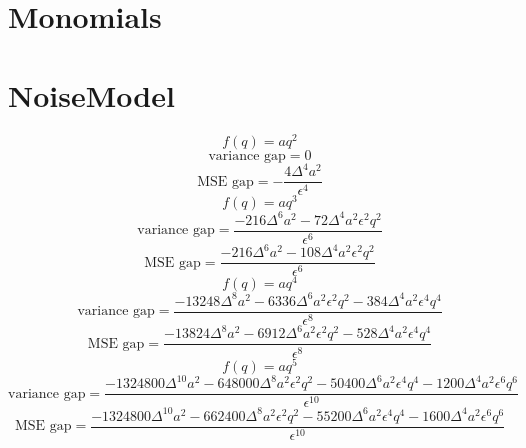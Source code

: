 \documentclass{article}
\begin{document}
\section*{Monomials}
\section*{NoiseModel}
\begin{dmath*}
f(q) = a q^{2}
\end{dmath*}
\begin{dmath*}
\text{variance gap} = 0
\end{dmath*}
\begin{dmath*}
\text{MSE gap} = - \frac{4 \Delta^{4} a^{2}}{\epsilon^{4}}
\end{dmath*}
\begin{dmath*}
f(q) = a q^{3}
\end{dmath*}
\begin{dmath*}
\text{variance gap} = \frac{- 216 \Delta^{6} a^{2} - 72 \Delta^{4} a^{2} \epsilon^{2} q^{2}}{\epsilon^{6}}
\end{dmath*}
\begin{dmath*}
\text{MSE gap} = \frac{- 216 \Delta^{6} a^{2} - 108 \Delta^{4} a^{2} \epsilon^{2} q^{2}}{\epsilon^{6}}
\end{dmath*}
\begin{dmath*}
f(q) = a q^{4}
\end{dmath*}
\begin{dmath*}
\text{variance gap} = \frac{- 13248 \Delta^{8} a^{2} - 6336 \Delta^{6} a^{2} \epsilon^{2} q^{2} - 384 \Delta^{4} a^{2} \epsilon^{4} q^{4}}{\epsilon^{8}}
\end{dmath*}
\begin{dmath*}
\text{MSE gap} = \frac{- 13824 \Delta^{8} a^{2} - 6912 \Delta^{6} a^{2} \epsilon^{2} q^{2} - 528 \Delta^{4} a^{2} \epsilon^{4} q^{4}}{\epsilon^{8}}
\end{dmath*}
\begin{dmath*}
f(q) = a q^{5}
\end{dmath*}
\begin{dmath*}
\text{variance gap} = \frac{- 1324800 \Delta^{10} a^{2} - 648000 \Delta^{8} a^{2} \epsilon^{2} q^{2} - 50400 \Delta^{6} a^{2} \epsilon^{4} q^{4} - 1200 \Delta^{4} a^{2} \epsilon^{6} q^{6}}{\epsilon^{10}}
\end{dmath*}
\begin{dmath*}
\text{MSE gap} = \frac{- 1324800 \Delta^{10} a^{2} - 662400 \Delta^{8} a^{2} \epsilon^{2} q^{2} - 55200 \Delta^{6} a^{2} \epsilon^{4} q^{4} - 1600 \Delta^{4} a^{2} \epsilon^{6} q^{6}}{\epsilon^{10}}
\end{dmath*}
\end{document}
